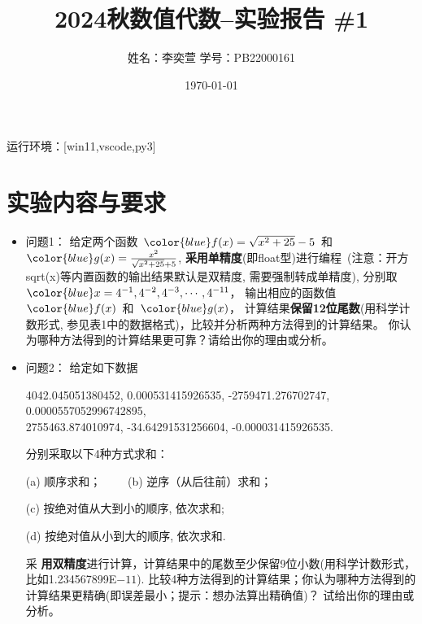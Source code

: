 \documentclass[10pt,a4paper,oneside]{article}
\title{\bf 2024秋数值代数--实验报告 \#1}
\author{姓名：李奕萱  学号：PB22000161 }
\date{\today}
\begin{document}
\maketitle

运行环境：[win11,vscode,py3]

\section*{实验内容与要求}
\begin{itemize}
  \item{问题1：}
  给定两个函数~$\color{blue}f(x)=\sqrt{x^2+25}-5$~和~$\color{blue}g(x)=\frac{x^2}{\sqrt{x^2+25}+5}$,
{\bf\color{red} 采用单精度}(即float型)进行编程~(注意：开方sqrt(x)等内置函数的输出结果默认是双精度,
需要强制转成单精度), 分别取
~$\color{blue}x=4^{-1}, 4^{-2}, 4^{-3}, \cdots, 4^{-11}$，
输出相应的函数值~$\color{blue}f(x)$~和~$\color{blue}g(x)$，
计算结果{\bf 保留12位尾数}(用科学计数形式, 参见表1中的数据格式)，比较并分析两种方法得到的计算结果。
你认为哪种方法得到的计算结果更可靠？请给出你的理由或分析。

  \item{问题2：} 给定如下数据
 

4042.045051380452, 0.000531415926535, -2759471.276702747, 0.0000557052996742895, \\
2755463.874010974, -34.64291531256604,  -0.000031415926535.

分别采取以下4种方式求和：

(a) 顺序求和； ~~~~(b) 逆序（从后往前）求和；

(c) 按绝对值从大到小的顺序, 依次求和;

(d) 按绝对值从小到大的顺序, 依次求和.

采{\bf\color{red} 用双精度}进行计算，计算结果中的尾数至少保留9位小数(用科学计数形式，比如1.234567899E$-11$). 
比较4种方法得到的计算结果；你认为哪种方法得到的计算结果更精确(即误差最小；提示：想办法算出精确值)？
试给出你的理由或分析。



\end{itemize}
\end{document}
